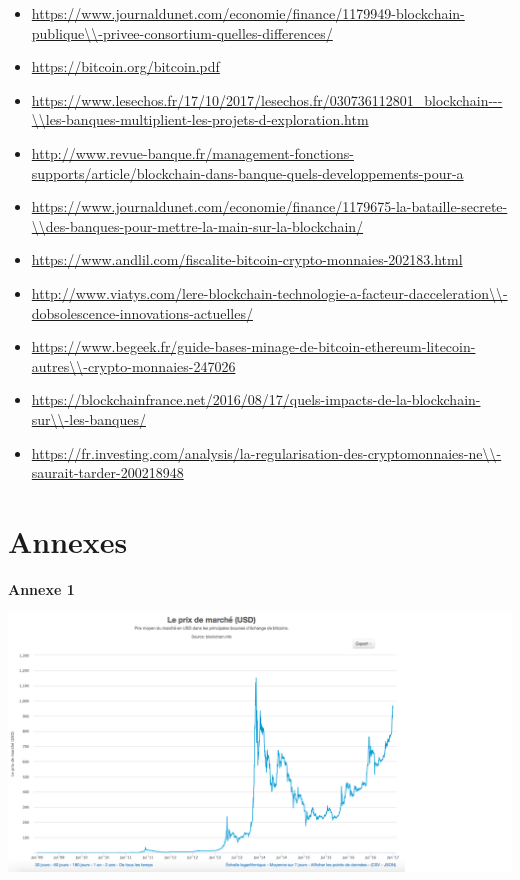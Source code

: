 \documentclass[12pt]{report}
\begin{document}
\begin{itemize}
    \item \url{https://www.journaldunet.com/economie/finance/1179949-blockchain-publique\\-privee-consortium-quelles-differences/}
    \\
    \item \url{https://bitcoin.org/bitcoin.pdf}
    \\
    \item \url{https://www.lesechos.fr/17/10/2017/lesechos.fr/030736112801_blockchain---\\les-banques-multiplient-les-projets-d-exploration.htm}
    \\
    \item \url{http://www.revue-banque.fr/management-fonctions-supports/article/blockchain-dans-banque-quels-developpements-pour-a}
    \\
    \item \url{https://www.journaldunet.com/economie/finance/1179675-la-bataille-secrete-\\des-banques-pour-mettre-la-main-sur-la-blockchain/}
     \\
    \item \url{https://www.andlil.com/fiscalite-bitcoin-crypto-monnaies-202183.html}
     \\
    \item \url{http://www.viatys.com/lere-blockchain-technologie-a-facteur-dacceleration\\-dobsolescence-innovations-actuelles/}
     \\
    \item \url{https://www.begeek.fr/guide-bases-minage-de-bitcoin-ethereum-litecoin-autres\\-crypto-monnaies-247026}
     \\
    \item \url{https://blockchainfrance.net/2016/08/17/quels-impacts-de-la-blockchain-sur\\-les-banques/}
     \\
    \item \url{https://fr.investing.com/analysis/la-regularisation-des-cryptomonnaies-ne\\-saurait-tarder-200218948}
\end{itemize}
\quad

\newpage
\section{Annexes}

\textbf{Annexe 1}\\
\begin{center}
    \includegraphics[width=1.3\textwidth]{courbeBTC}
\end{center}
\end{document}
